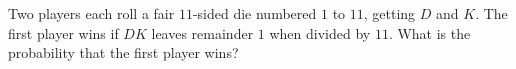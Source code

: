 Two players each roll a fair $11$-sided die numbered $1$ to $11$, getting $D$ and $K$. The first player wins if $DK$ leaves remainder $1$ when divided by $11$. What is the probability that the first player wins?
